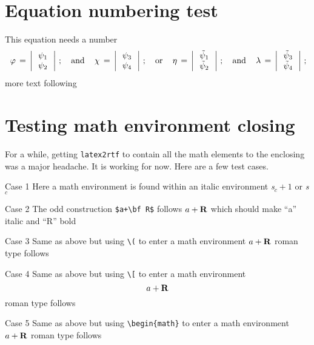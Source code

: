 \documentclass{article}
\begin{document}
\section{Equation numbering test}
This equation needs a number 
\begin{equation}\label{ab3}
\,\varphi\,=\,\left|\,
\begin{array}{c}
\psi_1 \\
\psi_2
\end{array}\,\right|\,; \quad {\rm and} \quad
\,\chi\,=\,\left|\,
\begin{array}{c}
\psi_3 \\
\psi_4
\end{array}\,\right|\,; \quad {\rm or} \quad
\,\eta\,=\,\left|\,
\begin{array}{c}
\tilde{\psi}_1 \\
\tilde{\psi}_2
\end{array}\,\right|\,; \quad {\rm and} \quad
\,\lambda\,=\,\left|\,
\begin{array}{c}
\tilde{\psi}_3 \\
\tilde{\psi}_4
\end{array}\,\right|\,;
\end{equation}
more text following

\section{Testing math environment closing}

For a while, getting \texttt{latex2rtf} to contain all the math elements
to the enclosing was a major headache.  It is working for now.  Here are
a few test cases.

Case 1 Here a math environment is found within an italic environment
\textit{s$_c+1$} or {\it s$_c$}

Case 2 The odd construction \verb#$a+\bf R$# follows $a+\bf R$ which
should make ``a'' italic and ``R'' bold

Case 3 Same as above but using \verb#\(# to enter a math environment
\(a+\bf R\) roman type follows

Case 4 Same as above but using \verb#\[# to enter a math environment \[a+\bf R\] 
roman type follows

Case 5 Same as above but using \verb#\begin{math}# to enter a math environment
\begin{math}a+\bf R\end{math} roman type follows
\end{document}

